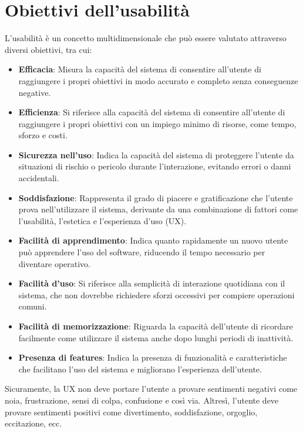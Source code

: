 \documentclass{report}
\begin{document}
	\section{Obiettivi dell'usabilità}
	L'usabilità è un concetto multidimensionale che può essere valutato attraverso diversi obiettivi, tra cui:
	\begin{itemize}
		\item \textbf{Efficacia}: Misura la capacità del sistema di consentire all'utente di raggiungere i propri obiettivi in modo accurato e completo senza conseguenze negative.
		\item \textbf{Efficienza}: Si riferisce alla capacità del sistema di consentire all'utente di raggiungere i propri obiettivi con un impiego minimo di risorse, come tempo, sforzo e costi.
		\item \textbf{Sicurezza nell'uso}: Indica la capacità del sistema di proteggere l'utente da situazioni di rischio o pericolo durante l'interazione, evitando errori o danni accidentali.
		\item \textbf{Soddisfazione}: Rappresenta il grado di piacere e gratificazione che l'utente prova nell'utilizzare il sistema, derivante da una combinazione di fattori come l'usabilità, l'estetica e l'esperienza d'uso (UX).
		\item \textbf{Facilità di apprendimento}: Indica quanto rapidamente un nuovo utente può apprendere l'uso del software, riducendo il tempo necessario per diventare operativo.
		\item \textbf{Facilità d'uso}: Si riferisce alla semplicità di interazione quotidiana con il sistema, che non dovrebbe richiedere sforzi occessivi per compiere operazioni comuni.
		\item \textbf{Facilità di memorizzazione}: Riguarda la capacità dell'utente di ricordare facilmente come utilizzare il sistema anche dopo lunghi periodi di inattività.
		\item \textbf{Presenza di features}: Indica la presenza di funzionalità e caratteristiche che facilitano l'uso del sistema e migliorano l'esperienza dell'utente.
	\end{itemize}
	Sicuramente, la UX non deve portare l'utente a provare sentimenti negativi come noia, frustrazione, sensi di colpa, confusione e così via. Altresì, l'utente deve provare sentimenti positivi come divertimento, soddisfazione, orgoglio, eccitazione, ecc.
	
\end{document}
